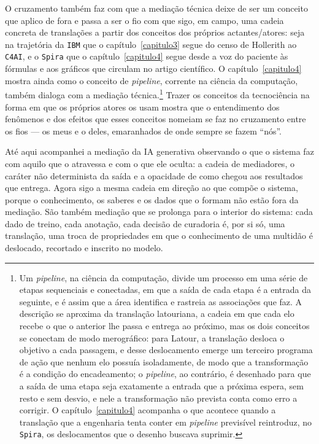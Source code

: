 O cruzamento também faz com que a mediação técnica deixe de ser um conceito que aplico de fora e passa a ser o fio com que sigo, em campo, uma cadeia concreta de translações a partir dos conceitos dos próprios actantes/atores: seja na trajetória da \texttt{IBM} que o capítulo~\ref{capitulo3} segue do censo de Hollerith ao \texttt{C4AI}, e o \texttt{Spira} que o capítulo~\ref{capitulo4} segue desde a voz do paciente às fórmulas e aos gráficos que circulam no artigo científico. O capítulo~\ref{capitulo4} mostra ainda como o conceito de \emph{pipeline}, corrente na ciência da computação, também dialoga com a mediação técnica.\footnote{Um \emph{pipeline}, na ciência da computação, divide um processo em uma série de etapas sequenciais e conectadas, em que a saída de cada etapa é a entrada da seguinte, e é assim que a área identifica e rastreia as associações que faz. A descrição se aproxima da translação latouriana, a cadeia em que cada elo recebe o que o anterior lhe passa e entrega ao próximo, mas os dois conceitos se conectam de modo merográfico: para Latour, a translação desloca o objetivo a cada passagem, e desse deslocamento emerge um terceiro programa de ação que nenhum elo possuía isoladamente, de modo que a transformação é a condição do encadeamento; o \emph{pipeline}, ao contrário, é desenhado para que a saída de uma etapa seja exatamente a entrada que a próxima espera, sem resto e sem desvio, e nele a transformação não prevista conta como erro a corrigir. O capítulo~\ref{capitulo4} acompanha o que acontece quando a translação que a engenharia tenta conter em \emph{pipeline} previsível reintroduz, no \texttt{Spira}, os deslocamentos que o desenho buscava suprimir.} Trazer os conceitos da tecnociência na forma em que os próprios atores os usam mostra que o entendimento dos fenômenos e dos efeitos que esses conceitos nomeiam se faz no cruzamento entre os fios --- os meus e o deles, emaranhados de onde sempre se fazem \enquote{nós}. 

Até aqui acompanhei a mediação da IA generativa observando o que o sistema faz com aquilo que o atravessa e com o que ele oculta: a cadeia de mediadores, o caráter não determinista da saída e a opacidade de como chegou aos resultados que entrega. Agora sigo a mesma cadeia em direção ao que compõe o sistema, porque o conhecimento, os saberes e os dados que o formam não estão fora da mediação. São também mediação que se prolonga para o interior do sistema: cada dado de treino, cada anotação, cada decisão de curadoria é, por si só, uma translação, uma troca de propriedades em que o conhecimento de uma multidão é deslocado, recortado e inscrito no modelo.

